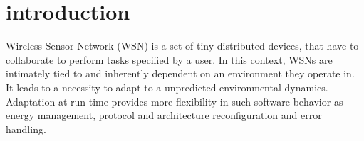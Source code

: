 \section{introduction}

Wireless Sensor Network (WSN) is a set of tiny distributed devices, that have 
to collaborate to perform tasks specified by a user. In this context, WSNs are
intimately tied to and inherently dependent on an environment they operate in.
It leads to a necessity to adapt to a unpredicted environmental dynamics.
Adaptation at run-time provides more flexibility in such software behavior as
energy management, protocol and architecture reconfiguration and error handling.